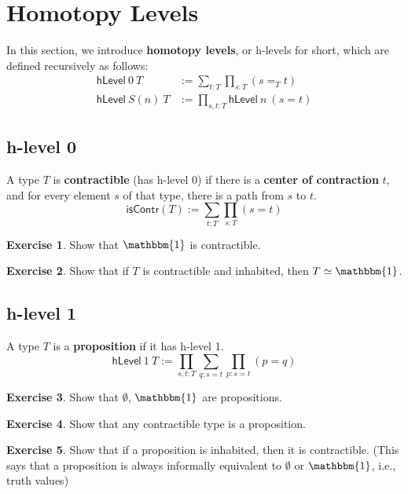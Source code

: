 \documentclass{amsart}
\theoremstyle{definition}
\newtheorem{ex}{Exercise}[section]
\newcommand{\isContr}{\ensuremath{\mathsf{isContr}}}
\newcommand{\hLevel}[2]{\ensuremath{\mathsf{hLevel}~#1~#2}}
\renewcommand{\emph}{\textbf}
\begin{document}
\section{Homotopy Levels}
In this section, we introduce \emph{homotopy levels}, or h-levels for short, which are defined recursively as follows:
\begin{align*}
    \mathsf{hLevel}~0~T &:= \sum_{t : T}\prod_{s : T}(s =_T t)\\
    \mathsf{hLevel}~S(n)~T &:= \prod_{s,t : T}\mathsf{hLevel}~n~(s = t)
\end{align*}

\subsection{h-level 0}\label{sec:h-level-0}
A type $T$ is \emph{contractible} (has h-level 0) if there is a \emph{center of contraction} $t$, and for every element $s$ of that type, there is a path from $s$ to $t$.
\[
    \isContr(T) := \sum_{t : T}\prod_{s : T} (s = t)
\]
\begin{ex}
Show that $\mathbbm{1}$ is contractible.
\end{ex}

\begin{ex}
Show that if $T$ is contractible and inhabited, then $T \simeq \mathbbm{1}$.
\end{ex}

%    

\subsection{h-level 1}\label{sec:h-level-1}
A type $T$ is a \emph{proposition} if it has h-level 1.
\[
    \hLevel{1}{T} := \prod_{s,t : T}\sum_{q : s = t}\prod_{p : s = t}(p = q)
\]
\begin{ex}
Show that $\emptyset$, $\mathbbm{1}$ are propositions.
\end{ex}

\begin{ex}
Show that any contractible type is a proposition.
\end{ex}

\begin{ex}
Show that if a proposition is inhabited, then it is contractible. (This says that a proposition is always informally equivalent to $\emptyset$ or $\mathbbm{1}$, i.e., truth values) %
\end{ex}
\end{document}

